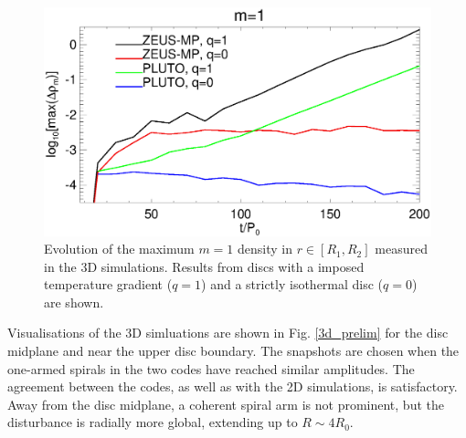 
\begin{figure}
  \includegraphics[width=\linewidth]{figures/m1_analysis_plot_ampmax3d.ps}
  \caption{Evolution of the maximum $m=1$ density in  $r\in[R_1,R_2]$
    measured in the 3D simulations. Results from discs with a imposed 
    temperature gradient ($q=1$) and a strictly isothermal disc
    ($q=0$) are shown.  
    \label{3d_ampmax}}   
\end{figure}

Visualisations of the 3D simluations are shown in   
Fig. \ref{3d_prelim} for the disc midplane and near the upper disc
boundary. The snapshots are chosen when the one-armed spirals in the two codes
have reached similar amplitudes. The agreement between the codes,
as well as with the 2D simulations, is satisfactory. Away from the
disc midplane, a coherent spiral arm is not prominent, but the
disturbance is radially more global, extending up to $R\sim 4R_0$.   


